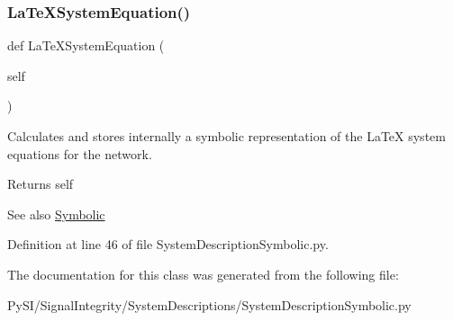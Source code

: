 \subsubsection{\texorpdfstring{La\+Te\+X\+System\+Equation()}{LaTeXSystemEquation()}}
{\footnotesize\ttfamily def La\+Te\+X\+System\+Equation (\begin{DoxyParamCaption}\item[{}]{self }\end{DoxyParamCaption})}



Calculates and stores internally a symbolic representation of the La\+TeX system equations for the network. 

\begin{DoxyReturn}{Returns}
self 
\end{DoxyReturn}
\begin{DoxySeeAlso}{See also}
\hyperlink{namespaceSignalIntegrity_1_1SystemDescriptions_1_1Symbolic}{Symbolic} 
\end{DoxySeeAlso}


Definition at line 46 of file System\+Description\+Symbolic.\+py.



The documentation for this class was generated from the following file\+:\begin{DoxyCompactItemize}
\item 
Py\+S\+I/\+Signal\+Integrity/\+System\+Descriptions/System\+Description\+Symbolic.\+py\end{DoxyCompactItemize}
